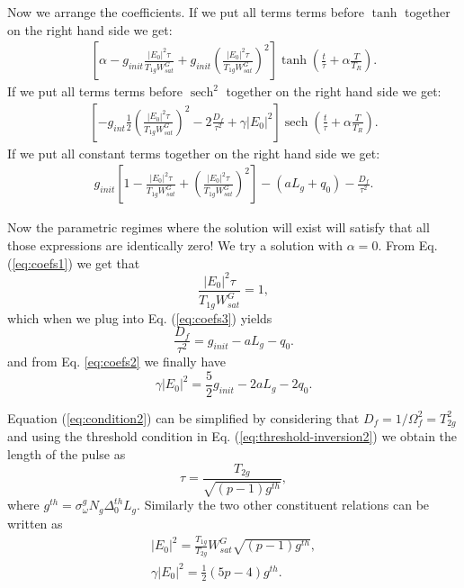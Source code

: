 \documentclass[preprint,secnumarabic,amssymb, nobibnotes, aip, prd]{revtex4-1}
\DeclareMathOperator{\sech}{sech}
\begin{document}
Now we arrange the coefficients. If we put all terms terms before $\tanh $ together on the right hand side we get:
\begin{align}
\label{eq:coefs1}
\left[\alpha -g_{init}\frac{|E_0|^2\tau}{T_{1g}W_{sat}^G} +g_{init}\left(\frac{|E_0|^2\tau}{T_{1g}W_{sat}^G}\right)^2 \right]\tanh(\frac{t}{\tau}+\alpha \frac{T}{T_R}).
\end{align}
If we put all terms terms before $\sech^2 $ together on the right hand side we get:
\begin{align}
\label{eq:coefs2}
\left[ -g_{int}\frac{1}{2}\left(\frac{|E_0|^2\tau}{T_{1g}W_{sat}^G}\right)^2 - 2\frac{D_f}{\tau^2} +\gamma|E_0|^2\right]\sech(\frac{t}{\tau}+\alpha \frac{T}{T_R}).
\end{align}
If we put all constant terms together on the right hand side we get:
\begin{align}
\label{eq:coefs3}
g_{init}\left[1-\frac{|E_0|^2\tau}{T_{1g}W_{sat}^G}+\left(\frac{|E_0|^2\tau}{T_{1g}W_{sat}^G}\right)^2 \right] -(aL_g+q_0) - \frac{D_f}{\tau^2}.
\end{align}

Now the parametric regimes where the solution will exist will satisfy that all those expressions are identically zero! We try a solution with $\alpha = 0$. From Eq. (\ref{eq:coefs1}) we get that
\begin{equation}
\label{eq:condition1}
\frac{|E_0|^2\tau}{T_{1g}W_{sat}^G}=1,
\end{equation}
which when we plug into Eq. (\ref{eq:coefs3}) yields
\begin{equation}
\label{eq:condition2}
\frac{D_f}{\tau^2} = g_{init} - aL_g-q_0. 
\end{equation}
and from Eq. \ref{eq:coefs2} we finally have
\begin{equation}
\label{eq:condition3}
\gamma|E_0|^2 = \frac{5}{2}g_{init}-2aL_g-2q_0.
\end{equation}

Equation (\ref{eq:condition2}) can be simplified by considering that $D_f = 1/\Omega_f^2 = T_{2g}^2$ and using the threshold condition in Eq. (\ref{eq:threshold-inversion2}) we obtain the length of the pulse as
\begin{equation}
\label{eq:duration}
\tau = \frac{T_{2g}}{\sqrt{(p-1)g^{th}}},
\end{equation}
where $g^{th} = \sigma_\omega^g N_g \Delta_0^{th}L_g$. Similarly the two other constituent relations can be written as
\begin{align}
|E_0|^2 = \frac{T_{1g}}{T_{2g}}W_{sat}^G\sqrt{(p-1)g^{th}}, \\
\gamma |E_0|^2 = \frac{1}{2}(5p-4)g^{th}.
\end{align}
\end{document}
